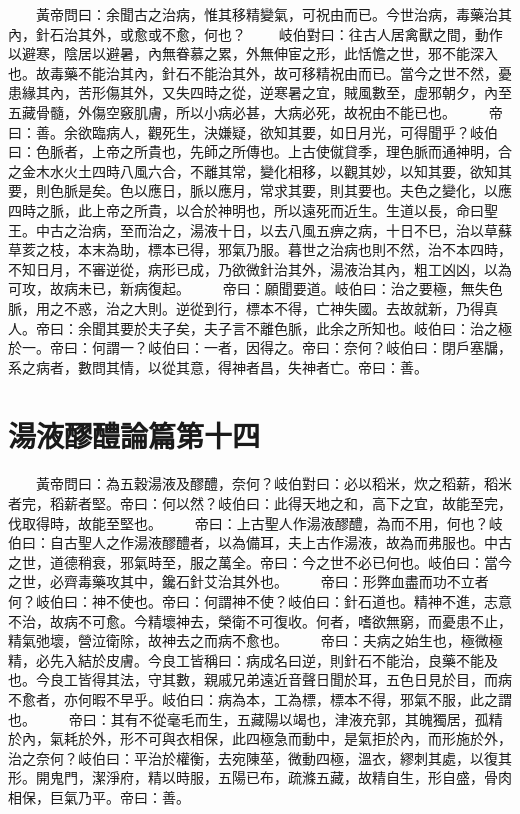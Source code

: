 　　黃帝問曰：余聞古之治病，惟其移精變氣，可祝由而已。今世治病，毒藥治其內，針石治其外，或愈或不愈，何也？
　　岐伯對曰：往古人居禽獸之間，動作以避寒，陰居以避暑，內無眷慕之累，外無伸宦之形，此恬憺之世，邪不能深入也。故毒藥不能治其內，針石不能治其外，故可移精祝由而已。當今之世不然，憂患緣其內，苦形傷其外，又失四時之從，逆寒暑之宜，賊風數至，虛邪朝夕，內至五藏骨髓，外傷空竅肌膚，所以小病必甚，大病必死，故祝由不能已也。
　　帝曰：善。余欲臨病人，觀死生，決嫌疑，欲知其要，如日月光，可得聞乎？岐伯曰：色脈者，上帝之所貴也，先師之所傳也。上古使僦貸季，理色脈而通神明，合之金木水火土四時八風六合，不離其常，變化相移，以觀其妙，以知其要，欲知其要，則色脈是矣。色以應日，脈以應月，常求其要，則其要也。夫色之變化，以應四時之脈，此上帝之所貴，以合於神明也，所以遠死而近生。生道以長，命曰聖王。中古之治病，至而治之，湯液十日，以去八風五痹之病，十日不巳，治以草蘇草荄之枝，本末為助，標本已得，邪氣乃服。暮世之治病也則不然，治不本四時，不知日月，不審逆從，病形已成，乃欲微針治其外，湯液治其內，粗工凶凶，以為可攻，故病未已，新病復起。
　　帝曰：願聞要道。岐伯曰：治之要極，無失色脈，用之不惑，治之大則。逆從到行，標本不得，亡神失國。去故就新，乃得真人。帝曰：余聞其要於夫子矣，夫子言不離色脈，此余之所知也。岐伯曰：治之極於一。帝曰：何謂一？岐伯曰：一者，因得之。帝曰：奈何？岐伯曰：閉戶塞牖，系之病者，數問其情，以從其意，得神者昌，失神者亡。帝曰：善。


\section{湯液醪醴論篇第十四}

　　黃帝問曰：為五穀湯液及醪醴，奈何？岐伯對曰：必以稻米，炊之稻薪，稻米者完，稻薪者堅。帝曰：何以然？岐伯曰：此得天地之和，高下之宜，故能至完，伐取得時，故能至堅也。
　　帝曰：上古聖人作湯液醪醴，為而不用，何也？岐伯曰：自古聖人之作湯液醪醴者，以為備耳，夫上古作湯液，故為而弗服也。中古之世，道德稍衰，邪氣時至，服之萬全。帝曰：今之世不必已何也。岐伯曰：當今之世，必齊毒藥攻其中，鑱石針艾治其外也。
　　帝曰：形弊血盡而功不立者何？岐伯曰：神不使也。帝曰：何謂神不使？岐伯曰：針石道也。精神不進，志意不治，故病不可愈。今精壞神去，榮衛不可復收。何者，嗜欲無窮，而憂患不止，精氣弛壞，營泣衛除，故神去之而病不愈也。
　　帝曰：夫病之始生也，極微極精，必先入結於皮膚。今良工皆稱曰：病成名曰逆，則針石不能治，良藥不能及也。今良工皆得其法，守其數，親戚兄弟遠近音聲日聞於耳，五色日見於目，而病不愈者，亦何暇不早乎。岐伯曰：病為本，工為標，標本不得，邪氣不服，此之謂也。
　　帝曰：其有不從毫毛而生，五藏陽以竭也，津液充郭，其魄獨居，孤精於內，氣耗於外，形不可與衣相保，此四極急而動中，是氣拒於內，而形施於外，治之奈何？岐伯曰：平治於權衡，去宛陳莝，微動四極，溫衣，繆刺其處，以復其形。開鬼門，潔淨府，精以時服，五陽已布，疏滌五藏，故精自生，形自盛，骨肉相保，巨氣乃平。帝曰：善。


